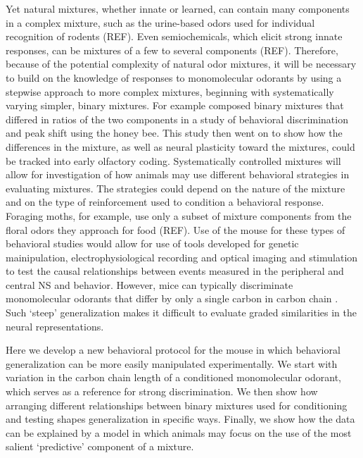  Yet natural mixtures, whether innate or learned, can contain many components in a complex mixture, such as the urine-based odors used for individual recognition of rodents (REF). 
 Even semiochemicals, which elicit strong innate responses,  can be mixtures of a few to several components (REF). 
 Therefore, because of the potential complexity of natural odor mixtures, it will be necessary to build on the knowledge of responses to monomolecular odorants by using a stepwise approach to more complex mixtures, beginning with systematically varying simpler, binary mixtures. 
 For example \cite{19692594} composed binary mixtures that differed in ratios of the two components in a study of behavioral discrimination and peak shift using the honey bee. 
 This study then went on to show how the differences in the mixture, as well as neural plasticity toward the mixtures, could be tracked into early olfactory coding. 
Systematically controlled mixtures will allow for investigation of how animals may use different behavioral strategies in evaluating mixtures. 
The strategies could depend on the nature of the mixture and on the type of reinforcement used to condition a behavioral response. 
Foraging moths, for example, use only a subset of mixture components from the floral odors they approach for food (REF). Use of the mouse for these types of behavioral studies would allow for use of tools developed for genetic mainipulation, electrophysiological recording and optical imaging and stimulation to test the causal relationships between events measured in the peripheral and central NS and behavior. 
However, mice can typically discriminate monomolecular odorants that differ by only a single carbon in carbon chain \cite{18810459}. 
Such ‘steep’ generalization makes it difficult to evaluate graded similarities in the neural representations. 

Here  we develop a new behavioral protocol for the mouse in which behavioral generalization can be more easily manipulated experimentally. 
We start with variation in the carbon chain length of a conditioned monomolecular odorant, which serves as a reference for strong discrimination. 
We then show how arranging different relationships between binary mixtures used for conditioning and testing shapes generalization in specific ways. 
Finally, we show how the data can be explained by a model in which animals may focus on the use of the most salient ‘predictive’ component of a mixture. 